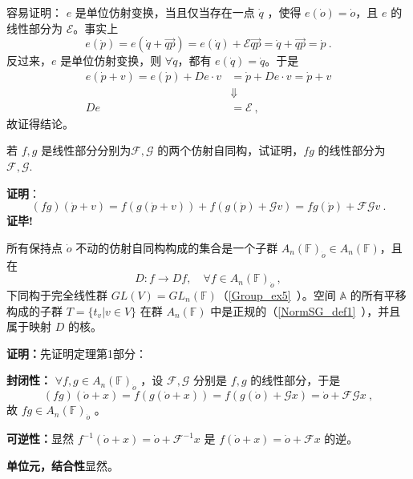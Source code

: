 容易证明： $e$ 是单位仿射变换，当且仅当存在一点 $\dot q$ ，使得 $e(\dot o)=\dot o$，且 $e$ 的线性部分为 $\mathcal E$。事实上
 \begin{equation}
  e(\dot p)=e(\dot q+\overrightarrow{qp})=e(\dot q)+\mathcal E \overrightarrow{qp}=\dot q+\overrightarrow{qp}=\dot p~.
 \end{equation}
反过来，$e$ 是单位仿射变换，则 $\forall\dot q$，都有 $e(\dot q)=\dot q$。于是
\begin{equation}
\begin{aligned}
e(\dot p+v)=e(\dot p)+De\cdot v&=\dot p+De\cdot v=\dot p+v\\
&\Downarrow\\
De&=\mathcal E~,
\end{aligned}
\end{equation}
故证得结论。
\begin{example}{}
若 $f,g$ 是线性部分分别为$\mathcal F,\mathcal G$ 的两个仿射自同构，试证明，$fg$ 的线性部分为 $\mathcal {F,G}$.

\textbf{证明}：\begin{equation}
(fg)(\dot p+v)=f(g(\dot p+v))+f(g(\dot p)+\mathcal G v)=fg(\dot p)+\mathcal {FG}v~.
\end{equation}
\textbf{证毕!}
\end{example}
\begin{theorem}{}
所有保持点 $\dot o$ 不动的仿射自同构构成的集合是一个子群 $A_n(\mathbb F)_{\dot o}\in A_n(\mathbb F)$，且在 
\begin{equation}
D:f\rightarrow Df,\quad \forall f\in A_n(\mathbb F)_{\dot o}~,
\end{equation}
下同构于完全线性群 $GL(V)=GL_n(\mathbb F)$（\autoref{Group_ex5}~）。空间 $\mathbb A$ 的所有平移构成的子群 $T=\{t_v|v\in V\}$ 在群 $A_n(\mathbb F)$ 中是正规的（\autoref{NormSG_def1}~），并且属于映射 $D$ 的核。
\end{theorem}
\textbf{证明：}先证明定理第1部分：

\textbf{封闭性：} $\forall f,g\in A_n(\mathbb F)_{\dot o}$ ，设 $\mathcal F,\mathcal G$ 分别是 $f,g$ 的线性部分，于是 
\begin{equation}
(fg)(\dot o+x)=f(g(\dot o+x))=f(g(\dot o)+\mathcal G x)=\dot o+\mathcal{FG}x~,
\end{equation}
故 $fg\in A_n(\mathbb F)_{\dot o}$ 。

\textbf{可逆性：}显然 $f^{-1}(\dot o+x)=\dot o+\mathcal F^{-1}x$ 是 $f(\dot o+x)=\dot o+\mathcal F x$ 的逆。

\textbf{单位元，结合性}显然。

